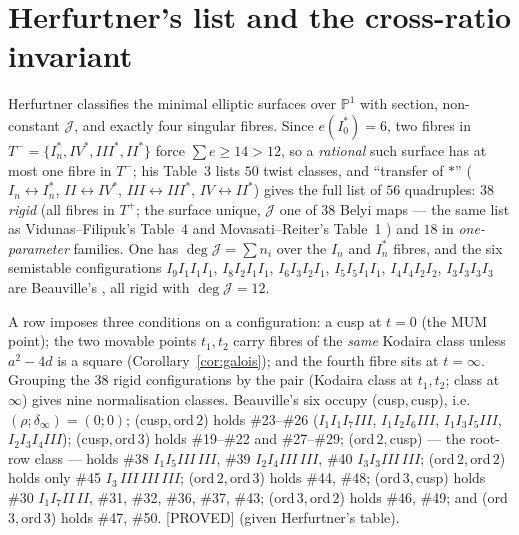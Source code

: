 \documentclass[11pt,reqno]{amsart}
\theoremstyle{plain}
\theoremstyle{definition}
\theoremstyle{remark}
\theoremstyle{plain}
\newcommand{\PP}{\mathbb{P}}
\newcommand{\Proved}{\textup{\textsf{[PROVED]}}}
\begin{document}
\section{Herfurtner's list and the cross-ratio invariant}\label{sec:herf}

Herfurtner \cite{Herfurtner1991} classifies the minimal elliptic surfaces over
$\PP^1$ with section, non-constant $\mathcal J$, and exactly four singular
fibres. Since $e(I_0^*)=6$, two fibres in $T^-=\{I_n^*,IV^*,III^*,II^*\}$ force
$\sum e\ge14>12$, so a \emph{rational} such surface has at most one fibre in
$T^-$; his Table~3 lists $50$ twist classes, and ``transfer of $*$''
($I_n\leftrightarrow I_n^*$, $II\leftrightarrow IV^*$, $III\leftrightarrow III^*$,
$IV\leftrightarrow II^*$) gives the full list of $56$ quadruples: $38$
\emph{rigid} (all fibres in $T^+$; the surface unique, $\mathcal J$ one of $38$
Belyi maps --- the same list as Vidunas--Filipuk's Table~4 \cite{VidunasFilipuk}
and Movasati--Reiter's Table~1 \cite{MovasatiReiter}) and $18$ in
\emph{one-parameter} families. One has $\deg\mathcal J=\sum n_i$ over the $I_n$
and $I_n^*$ fibres, and the six semistable configurations
$I_9I_1I_1I_1$, $I_8I_2I_1I_1$, $I_6I_3I_2I_1$, $I_5I_5I_1I_1$, $I_4I_4I_2I_2$,
$I_3I_3I_3I_3$ are Beauville's \cite{Beauville1982}, all rigid with
$\deg\mathcal J=12$.

A row imposes three conditions on a configuration: a cusp at $t=0$ (the MUM
point); the two movable points $t_1,t_2$ carry fibres of the \emph{same} Kodaira
class unless $a^2-4d$ is a square (Corollary~\ref{cor:galois}); and the fourth
fibre sits at $t=\infty$. Grouping the $38$ rigid configurations by the pair
(Kodaira class at $t_1,t_2$; class at $\infty$) gives nine normalisation
classes. Beauville's six occupy
(cusp,\,cusp), i.e.\ $(\rho;\delta_\infty)=(0;0)$; (cusp,\,ord\,$2$) holds
\#23--\#26 ($I_1I_1I_7III$, $I_1I_2I_6III$, $I_1I_3I_5III$, $I_2I_3I_4III$);
(cusp,\,ord\,$3$) holds \#19--\#22 and \#27--\#29; (ord\,$2$,\,cusp) --- the
root-row class --- holds \#38 $I_1I_5III\,III$, \#39 $I_2I_4III\,III$, \#40
$I_3I_3III\,III$; (ord\,$2$,\,ord\,$2$) holds only \#45 $I_3\,III\,III\,III$;
(ord\,$2$,\,ord\,$3$) holds \#44, \#48; (ord\,$3$,\,cusp) holds \#30
$I_1I_7II\,II$, \#31, \#32, \#36, \#37, \#43; (ord\,$3$,\,ord\,$2$) holds \#46,
\#49; and (ord\,$3$,\,ord\,$3$) holds \#47, \#50. \Proved{} (given Herfurtner's
table).
\end{document}

